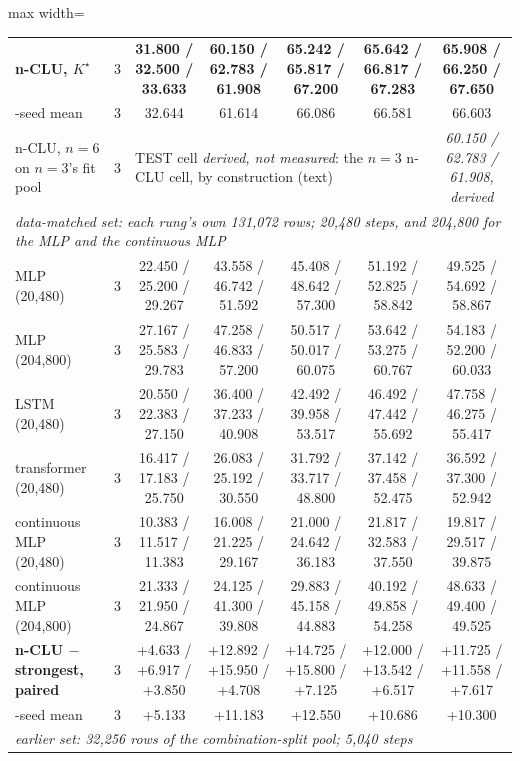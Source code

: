 \documentclass{article} %
\newcommand{\Kstar}{\ensuremath{K^{\star}}}
\begin{document}
\begin{table}[t]
\begin{adjustbox}{max width=\linewidth}
\begin{tabular}{lcccccc}
\textbf{n-CLU, $\Kstar$} & 3 & \textbf{31.800 / 32.500 / 33.633} & \textbf{60.150 / 62.783 / 61.908} & \textbf{65.242 / 65.817 / 67.200} & \textbf{65.642 / 66.817 / 67.283} & \textbf{65.908 / 66.250 / 67.650} \\
\quad 3-seed mean & 3 & 32.644 & 61.614 & 66.086 & 66.581 & 66.603 \\
n-CLU, $n=6$ on $n=3$'s fit pool & 3 & \multicolumn{4}{l}{TEST cell \emph{derived, not measured}: the $n=3$ n-CLU cell, by construction (text)} & \emph{60.150 / 62.783 / 61.908, derived} \\ %
\midrule
\multicolumn{7}{l}{\emph{data-matched set: each rung's own 131,072 rows; 20,480 steps, and 204,800 for the MLP and the continuous MLP}} \\ %
MLP (20,480) & 3 & 22.450 / 25.200 / 29.267 & 43.558 / 46.742 / 51.592 & 45.408 / 48.642 / 57.300 & 51.192 / 52.825 / 58.842 & 49.525 / 54.692 / 58.867 \\
MLP (204,800) & 3 & 27.167 / 25.583 / 29.783 & 47.258 / 46.833 / 57.200 & 50.517 / 50.017 / 60.075 & 53.642 / 53.275 / 60.767 & 54.183 / 52.200 / 60.033 \\
LSTM (20,480) & 3 & 20.550 / 22.383 / 27.150 & 36.400 / 37.233 / 40.908 & 42.492 / 39.958 / 53.517 & 46.492 / 47.442 / 55.692 & 47.758 / 46.275 / 55.417 \\
transformer (20,480) & 3 & 16.417 / 17.183 / 25.750 & 26.083 / 25.192 / 30.550 & 31.792 / 33.717 / 48.800 & 37.142 / 37.458 / 52.475 & 36.592 / 37.300 / 52.942 \\
continuous MLP (20,480) & 3 & 10.383 / 11.517 / 11.383 & 16.008 / 21.225 / 29.167 & 21.000 / 24.642 / 36.183 & 21.817 / 32.583 / 37.550 & 19.817 / 29.517 / 39.875 \\
continuous MLP (204,800) & 3 & 21.333 / 21.950 / 24.867 & 24.125 / 41.300 / 39.808 & 29.883 / 45.158 / 44.883 & 40.192 / 49.858 / 54.258 & 48.633 / 49.400 / 49.525 \\
\textbf{n-CLU $-$ strongest, paired} & 3 & +4.633 / +6.917 / +3.850 & +12.892 / +15.950 / +4.708 & +14.725 / +15.800 / +7.125 & +12.000 / +13.542 / +6.517 & +11.725 / +11.558 / +7.617 \\
\quad 3-seed mean & 3 & +5.133 & +11.183 & +12.550 & +10.686 & +10.300 \\
\midrule
\multicolumn{7}{l}{\emph{earlier set: 32,256 rows of the combination-split pool; 5,040 steps}} \\ %

\end{tabular}
\end{adjustbox}
\end{table}
\end{document}
